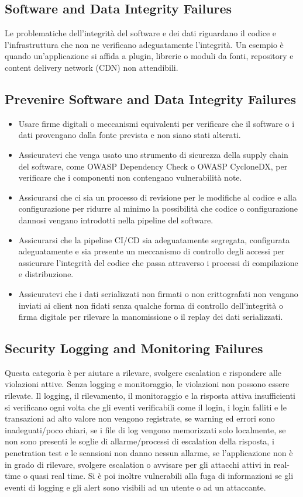 \subsection{Software and Data Integrity Failures}
Le problematiche dell'integrità del software e dei dati riguardano il codice e l'infrastruttura che non ne verificano adeguatamente l'integrità. Un esempio è quando un'applicazione si affida a plugin, librerie o moduli da fonti, repository e content delivery network (CDN) non attendibili.
\subsection{Prevenire Software and Data Integrity Failures}
\begin{itemize}
    \item Usare firme digitali o meccanismi equivalenti per verificare che il software o i dati provengano dalla fonte prevista e non siano stati alterati.
    \item Assicuratevi che venga usato uno strumento di sicurezza della supply chain del software, come OWASP Dependency Check o OWASP CycloneDX, per verificare che i componenti non contengano vulnerabilità note.
    \item Assicurarsi che ci sia un processo di revisione per le modifiche al codice e alla configurazione per ridurre al minimo la possibilità che codice o configurazione dannosi vengano introdotti nella pipeline del software.
    \item Assicurarsi che la pipeline CI/CD sia adeguatamente segregata, configurata adeguatamente e sia presente un meccanismo di controllo degli accessi per assicurare l'integrità del codice che passa attraverso i processi di compilazione e distribuzione.
    \item Assicuratevi che i dati serializzati non firmati o non crittografati non vengano inviati ai client non fidati senza qualche forma di controllo dell'integrità o firma digitale per rilevare la manomissione o il replay dei dati serializzati.  
\end{itemize}
\subsection{Security Logging and Monitoring Failures}
Questa categoria è per aiutare a rilevare, svolgere escalation e rispondere alle violazioni attive. Senza logging e monitoraggio, le violazioni non possono essere rilevate. Il logging, il rilevamento, il monitoraggio e la risposta attiva insufficienti si verificano ogni volta che gli eventi verificabili come il login, i login falliti e le transazioni ad alto valore non vengono registrate, se warning ed errori sono inadeguati/poco chiari, se i file di log vengono memorizzati solo localmente, se non sono presenti le soglie di allarme/processi di escalation della risposta, i penetration test e le scansioni non danno nessun allarme, se l’applicazione non è in grado di rilevare, svolgere escalation o avvisare per gli attacchi attivi in real-time o quasi real time. Si è poi inoltre vulnerabili alla fuga di informazioni se gli eventi di logging e gli alert sono visibili ad un utente o ad un attaccante.
